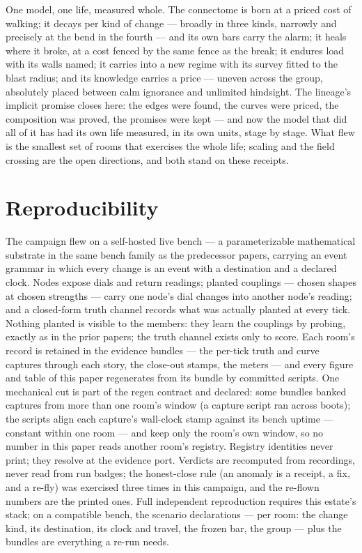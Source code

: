 \documentclass[11pt,a4paper]{article}
\begin{document}
One model, one life, measured whole. The connectome is born at a
priced cost of walking; it decays per kind of change --- broadly in
three kinds, narrowly and precisely at the bend in the fourth --- and
its own bars carry the alarm; it heals where it broke, at a cost
fenced by the same fence as the break; it endures load with its walls
named; it carries into a new regime with its survey fitted to the
blast radius; and its knowledge carries a price --- uneven across the
group, absolutely placed between calm ignorance and unlimited
hindsight. The lineage's
implicit promise closes here: the edges were found, the curves were
priced, the composition was proved, the promises were kept --- and
now the model that did all of it has had its own life measured, in
its own units, stage by stage. What flew is the smallest set of
rooms that exercises the whole life; scaling and the field crossing
are the open directions, and both stand on these receipts.

\section*{Reproducibility}

The campaign flew on a self-hosted live bench --- a parameterizable
mathematical substrate in the same bench family as the predecessor
papers, carrying an event grammar in which every change is an event
with a destination and a declared clock. Nodes expose dials and
return readings; planted couplings --- chosen shapes at chosen
strengths --- carry one node's dial changes into another node's
reading; and a closed-form truth channel records what was actually
planted at every tick. Nothing planted is visible to the members:
they learn the couplings by probing, exactly as in the prior papers;
the truth channel exists only to score. Each room's record is
retained in the evidence bundles --- the per-tick truth and curve
captures through each story, the close-out stamps, the meters ---
and every figure and table of this paper regenerates from its bundle
by committed scripts. One mechanical cut is part of the regen
contract and declared: some bundles banked captures from more than
one room's window (a capture script ran across boots); the scripts
align each capture's wall-clock stamp against its bench uptime ---
constant within one room --- and keep only the room's own window,
so no number in this paper reads another room's registry. Registry identities never print; they resolve at
the evidence port. Verdicts are recomputed from recordings, never
read from run badges; the honest-close rule (an anomaly is a
receipt, a fix, and a re-fly) was exercised three times in this
campaign, and the re-flown numbers are the printed ones. Full
independent reproduction requires this estate's stack; on a
compatible bench, the scenario declarations --- per room: the
change kind, its destination, its clock and travel, the frozen bar,
the group --- plus the bundles are everything a re-run needs.
\end{document}
